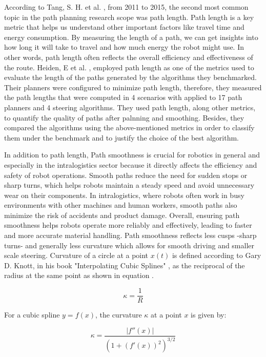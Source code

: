 According to Tang, S. H. et al. \cite{R20}, from 2011 to 2015, the second most common topic in the path 
planning research scope was path length. Path length is a key metric that helps us understand other 
important factors like travel time and energy consumption. By measuring the length of a path, we 
can get insights into how long it will take to travel and how much energy the robot might use. 
In other words, path length often reflects the overall efficiency and effectiveness of the route. 
Heiden, E et al. \cite{R23}, employed path length as one of the metrics used to evaluate the length of 
the paths generated by the algorithms they benchmarked. Their planners 
were configured to minimize path length, therefore, they measured the path lengths that were computed 
in 4 scenarios with applied to 17 path planners and 4 steering algorithms. They used path length,
along other metrics, to quantify the quality of paths after palnning and smoothing.
Besides, they compared the algorithms using the above-mentioned metrics in order to classify them
under the benchmark and to justify the choice of the best algorithm.  

In addition to path length, Path smoothness is crucial for robotics in general and especially 
in the intralogistics sector because it directly affects the efficiency and safety of robot 
operations. Smooth paths reduce the need for sudden stops or sharp turns, which helps robots 
maintain a steady speed and avoid unnecessary wear on their components. In intralogistics, 
where robots often work in busy environments with other machines and human workers, smooth 
paths also minimize the risk of accidents and product damage. Overall, ensuring path 
smoothness helps robots operate more reliably and effectively, leading to faster and 
more accurate material handling. Path smoothness reflects less cusps -sharp turns- and generally
less curvature which allows for smooth driving and smaller scale steering.
Curvature of a circle at a point \(x(t)\) is defined according to Gary D. Knott, in his book 
"Interpolating Cubic Splines" \cite{R34}, as the reciprocal of the radius at the same point as shown in
equation .

\begin{equation}
    \kappa = \frac{1}{R}
    \label{kurv}
\end{equation}

For a cubic spline \( y = f(x) \), the curvature \( \kappa \) at a point \( x \) is given by:

\begin{equation}
\kappa = \frac{|f''(x)|}{\left(1 + \left(f'(x)\right)^2\right)^{3/2}}
\end{equation}

